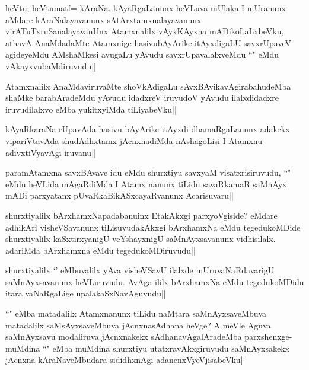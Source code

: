 \begin{artha}
heVtu, heVtumatf= kAraNa. kAyaRgaLanunx heVLuva mUlaka I mUranunx aMdare kAraNalayavanunx sAtArxtamxnalayavanunx virATuTxruSanalayavanUnx Atamxnalilx vAyxKAyxna mADikoLaLxbeVku, athavA AnaMdadaMte Atamxnige hasivubAyArike itAyxdigaLU savxrUpaveV agideyeMdu AMshaMkesi avugaLu yAvudu savxrUpavalalxveMdu ``\stext " eMdu vAkayxvubaMdiruvudu||
\end{artha}

\begin{artha}%
Atamxnalilx AnaMdaviruvaMte shoVkAdigaLu sAvxBAvikavAgirabahudeMba shaMke barabAradeMdu yAvudu idadxreV iruvudoV yAvudu ilalxdidadxre iruvudilalxvo eMba yukitxyiMda tiLiyabeVku||
\end{artha}

\begin{artha}
kAyaRkaraNa rUpavAda hasivu bAyArike itAyxdi dhamaRgaLanunx adakekx vipariVtavAda shudAdhxtamx jAcnxnadiMda nAshagoLisi I Atamxnu adivxtiVyavAgi iruvanu||
\end{artha}

\begin{artha}
paramAtamxna savxBAvave idu eMdu shurxtiyu savxyaM visatxrisiruvudu, ``\stext" eMdu heVLida mAgaRdiMda I Atamx nanunx tiLidu savaRkamaR saMnAyx mADi parxyatanx pUvaRkaBikASxcayaRvanunx Acarisuvaru||
\end{artha}


\begin{artha}
shurxtiyalilx bArxhamxNapadabanuinx EtakAkxgi parxyoVgiside? eMdare adhikAri visheVSavanunx tiLisuvudakAkxgi bArxhamxNa eMdu tegedukoMDide shurxtiyalilx kaSxtirxyanigU veYshayxnigU saMnAyxsavanunx vidhisilalx. adariMda bArxhamxna eMdu tegedukoMDiruvudu||
\end{artha}


\begin{artha}
shurxtiyalilx `\stext ' eMbuvalilx yAva visheVSavU ilalxde mUruvaNaRdavarigU saMnAyxsavanunx heVLiruvudu. AvAga ililx bArxhamxNa eMdu tegedukoMDidu itara vaNaRgaLige upalakaSxNavAguvudu||
\end{artha}

\begin{artha}
``\stext" eMba matadalilx Atamxnanunx tiLidu naMtara saMnAyxsaveMbuva matadalilx saMsAyxsaveMbuva jAcnxnasAdhana heVge? A meVle Aguva saMnAyxsavu modaliruva jAcnxnakekx sAdhanavAgalAradeMba parxshenxge-muMdina ``\stext" eMba muMdina shurxtiyu utatxravAkxgiruvudu saMnAyxsakekx jAcnxna kAraNaveMbudara sididhxnAgi adanenxVyeVjisabeVku||
\end{artha}

